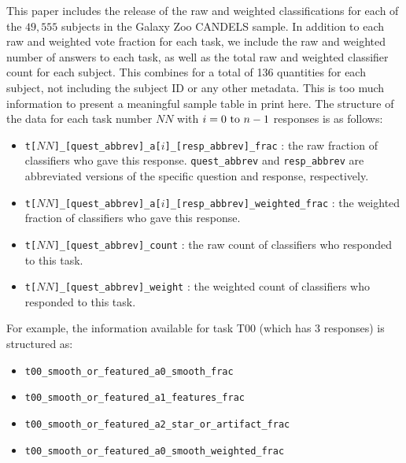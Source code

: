 \documentclass[useAMS,usenatbib]{mn2e}
\def\notebsm	{\color{titlecol}}
\begin{document}
{This paper includes the release of the raw and weighted classifications for each of the $49,555$ subjects in the Galaxy Zoo CANDELS sample. In addition to each raw and weighted vote fraction for each task, we include the raw and weighted number of answers to each task, as well as the total raw and weighted classifier count for each subject. This combines for a total of 136 quantities for each subject, not including the subject ID or any other metadata. {\notebsm This is too much information to present a meaningful sample table in print here.} The structure of the data for each task number $NN$ with $i = {0 {\rm\ to\ } n-1}$ responses is as follows:


\begin{itemize}
\item[] \small{\tt t[$NN$]\_[quest\_abbrev]\_a[$i$]\_[resp\_abbrev]\_frac} : the raw fraction of classifiers who gave this response. {\tt quest\_abbrev} and {\tt resp\_abbrev} are abbreviated versions of the specific question and response, respectively.

\item[] \small{\tt t[$NN$]\_[quest\_abbrev]\_a[$i$]\_[resp\_abbrev]\_weighted\_frac} : the weighted fraction of classifiers who gave this response. 

\item[] \small{\tt t[$NN$]\_[quest\_abbrev]\_count} : the raw count of classifiers who responded to this task. 

\item[] \small{\tt t[$NN$]\_[quest\_abbrev]\_weight} : the weighted count of classifiers who responded to this task. 

\end{itemize}

For example, the information available for task T00 (which has 3 responses) is structured as:

\begin{itemize}
\item[] \small{\tt t00\_smooth\_or\_featured\_a0\_smooth\_frac}

\item[] \small{\tt t00\_smooth\_or\_featured\_a1\_features\_frac}

\item[] \small{\tt t00\_smooth\_or\_featured\_a2\_star\_or\_artifact\_frac}

\item[] \small{\tt t00\_smooth\_or\_featured\_a0\_smooth\_weighted\_frac}


\end{itemize}}
\end{document}
